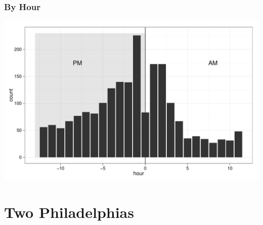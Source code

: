 \documentclass[]{beamer}
\newenvironment{knitrout}{}{} %
\renewenvironment{knitrout}{\begin{footnotesize}}{\end{footnotesize}}
\begin{document}
\begin{frame}[fragile]
\frametitle{By Hour}



\begin{knitrout}
\color{fgcolor}\includegraphics[width=\linewidth]{figures/murder-unnamed-chunk-6} 
\end{knitrout}

\end{frame}



\section{Two Philadelphias}
\end{document}
